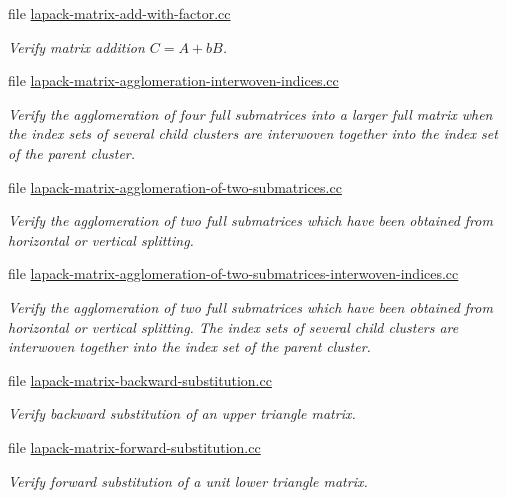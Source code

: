 \begin{DoxyCompactItemize}
file \hyperlink{lapack-matrix-add-with-factor_8cc}{lapack-\/matrix-\/add-\/with-\/factor.\+cc}
\begin{DoxyCompactList}\small\item\em Verify matrix addition $C = A + b B$. \end{DoxyCompactList}\item 
file \hyperlink{lapack-matrix-agglomeration-interwoven-indices_8cc}{lapack-\/matrix-\/agglomeration-\/interwoven-\/indices.\+cc}
\begin{DoxyCompactList}\small\item\em Verify the agglomeration of four full submatrices into a larger full matrix when the index sets of several child clusters are interwoven together into the index set of the parent cluster. \end{DoxyCompactList}\item 
file \hyperlink{lapack-matrix-agglomeration-of-two-submatrices_8cc}{lapack-\/matrix-\/agglomeration-\/of-\/two-\/submatrices.\+cc}
\begin{DoxyCompactList}\small\item\em Verify the agglomeration of two full submatrices which have been obtained from horizontal or vertical splitting. \end{DoxyCompactList}\item 
file \hyperlink{lapack-matrix-agglomeration-of-two-submatrices-interwoven-indices_8cc}{lapack-\/matrix-\/agglomeration-\/of-\/two-\/submatrices-\/interwoven-\/indices.\+cc}
\begin{DoxyCompactList}\small\item\em Verify the agglomeration of two full submatrices which have been obtained from horizontal or vertical splitting. The index sets of several child clusters are interwoven together into the index set of the parent cluster. \end{DoxyCompactList}\item 
file \hyperlink{lapack-matrix-backward-substitution_8cc}{lapack-\/matrix-\/backward-\/substitution.\+cc}
\begin{DoxyCompactList}\small\item\em Verify backward substitution of an upper triangle matrix. \end{DoxyCompactList}\item 
file \hyperlink{lapack-matrix-forward-substitution_8cc}{lapack-\/matrix-\/forward-\/substitution.\+cc}
\begin{DoxyCompactList}\small\item\em Verify forward substitution of a unit lower triangle matrix. \end{DoxyCompactList}\item 

\end{DoxyCompactItemize}
